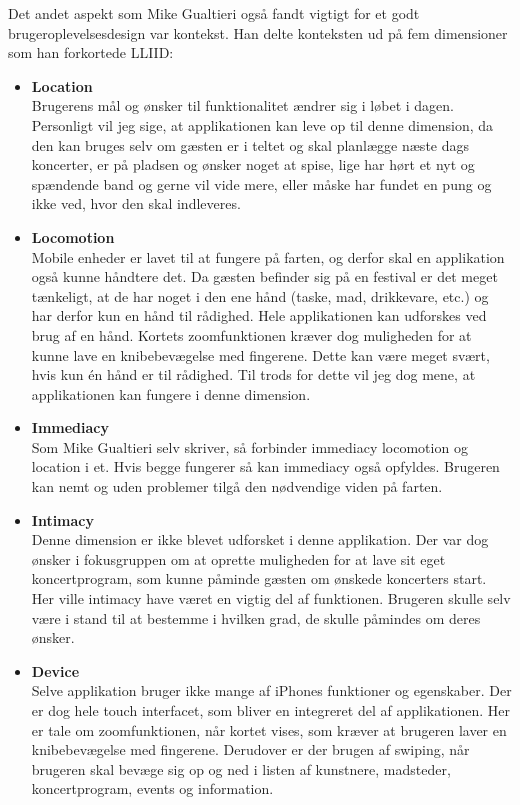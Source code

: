 \documentclass[a4paper,10pt,titlepage]{article}
\begin{document}
Det andet aspekt som Mike Gualtieri også fandt vigtigt for et godt brugeroplevelsesdesign var kontekst. Han delte konteksten ud på fem dimensioner som han forkortede LLIID:
\begin{itemize}
\item
\textbf{Location}\\
Brugerens mål og ønsker til funktionalitet ændrer sig i løbet i dagen. Personligt vil jeg sige, at applikationen kan leve op til denne dimension, da den kan bruges selv om gæsten er i teltet og skal planlægge næste dags koncerter, er på pladsen og ønsker noget at spise, lige har hørt et nyt og spændende band og gerne vil vide mere, eller måske har fundet en pung og ikke ved, hvor den skal indleveres. 
\item
\textbf{Locomotion}\\
Mobile enheder er lavet til at fungere på farten, og derfor skal en applikation også kunne håndtere det. Da gæsten befinder sig på en festival er det meget tænkeligt, at de har noget i den ene hånd (taske, mad, drikkevare, etc.) og har derfor kun en hånd til rådighed. Hele applikationen kan udforskes ved brug af en hånd. Kortets zoomfunktionen kræver dog muligheden for at kunne lave en knibebevægelse med fingerene. Dette kan være meget svært, hvis kun én hånd er til rådighed. Til trods for dette vil jeg dog mene, at applikationen kan fungere i denne dimension.
\item
\textbf{Immediacy}\\
Som Mike Gualtieri selv skriver, så forbinder immediacy locomotion og location i et. Hvis begge fungerer så kan immediacy også opfyldes. Brugeren kan nemt og uden problemer tilgå den nødvendige viden på farten.
\item
\textbf{Intimacy}\\
Denne dimension er ikke blevet udforsket i denne applikation. Der var dog ønsker i fokusgruppen om at oprette muligheden for at lave sit eget koncertprogram, som kunne påminde gæsten om ønskede koncerters start. Her ville intimacy have været en vigtig del af funktionen. Brugeren skulle selv være i stand til at bestemme i hvilken grad, de skulle påmindes om deres ønsker. 
\item
\textbf{Device}\\
Selve applikation bruger ikke mange af iPhones funktioner og egenskaber. Der er dog hele touch interfacet, som bliver en integreret del af applikationen. Her er tale om zoomfunktionen, når kortet vises, som kræver at brugeren laver en knibebevægelse med fingerene. Derudover er der brugen af swiping, når brugeren skal bevæge sig op og ned i listen af kunstnere, madsteder, koncertprogram, events og information.
\end{itemize}
\end{document}
